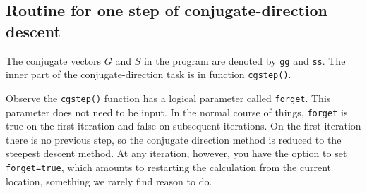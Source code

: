 \subsection{Routine for one step of conjugate-direction descent}
\par
\begin{comment}
The \bx{conjugate-direction program}
can be divided into two parts:
an inner part that is used almost without change
over a wide variety of applications,
and an outer part containing memory allocations,
operator invocations, and initializations.

Because \bx{Fortran} does not recognize the difference between upper- and
lower-case letters,
\end{comment}
The conjugate vectors $G$ and $S$ in the program are denoted by
{\tt gg} and {\tt ss}.
The inner part of the conjugate-direction task is in
function {\tt cgstep()}.%
\par
Observe the \texttt{cgstep()} function has a logical parameter
called \texttt{forget}.
This parameter does not need to be input.
In the normal course of things, \texttt{forget} is true
on the first iteration and false on subsequent iterations.
On the first iteration
there is no previous step,
so the conjugate direction method
is reduced to the steepest descent method.
At any iteration, however, you have the option to set
\texttt{forget=true},
which amounts to restarting the calculation
from the current location,
something we rarely find reason to do.


